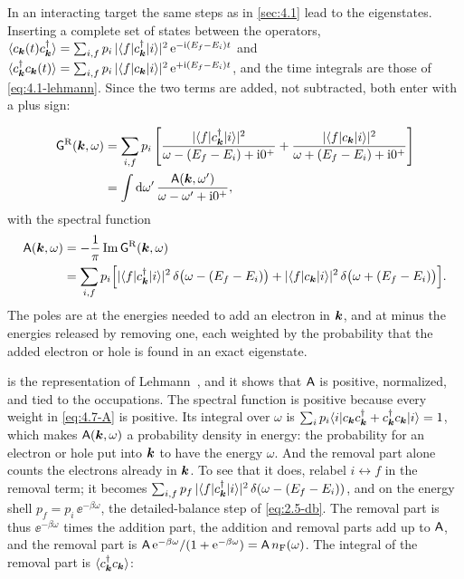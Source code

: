 In an interacting target the same steps as in \cref{sec:4.1} lead to the eigenstates. Inserting a complete set of states between the operators, $\langle c_{\bm{k}}(t)c^\dagger_{\bm{k}}\rangle = \sum_{i,f}p_i\,|\langle f|c^\dagger_{\bm{k}}|i\rangle|^2\,\mathrm{e}^{-\mathrm{i}(E_f - E_i)t}$ and $\langle c^\dagger_{\bm{k}}c_{\bm{k}}(t)\rangle = \sum_{i,f}p_i\,|\langle f|c_{\bm{k}}|i\rangle|^2\,\mathrm{e}^{+\mathrm{i}(E_f - E_i)t}$, and the time integrals are those of \cref{eq:4.1-lehmann}. Since the two terms are added, not subtracted, both enter with a plus sign:
\begin{keyresult}
\begin{equation}
  \begin{aligned}
  \mathsf{G}^{\mathrm{R}}(\bm{k},\omega) &= \sum_{i,f}p_i\left[\frac{|\langle f|c^\dagger_{\bm{k}}|i\rangle|^2}{\omega - (E_f - E_i) + \mathrm{i}0^+} + \frac{|\langle f|c_{\bm{k}}|i\rangle|^2}{\omega + (E_f - E_i) + \mathrm{i}0^+}\right] \\
  &= \int\mathrm{d}\omega'\,\frac{\mathsf{A}(\bm{k},\omega')}{\omega - \omega' + \mathrm{i}0^+} ,
  \end{aligned}
  \label{eq:4.7-lehmann}
\end{equation}
with the spectral function
\begin{equation}
  \begin{aligned}
  \mathsf{A}(\bm{k},\omega) &= -\frac{1}{\pi}\operatorname{Im}\mathsf{G}^{\mathrm{R}}(\bm{k},\omega) \\
  &= \sum_{i,f}p_i\Bigl[|\langle f|c^\dagger_{\bm{k}}|i\rangle|^2\,\delta\bigl(\omega - (E_f - E_i)\bigr) + |\langle f|c_{\bm{k}}|i\rangle|^2\,\delta\bigl(\omega + (E_f - E_i)\bigr)\Bigr] .
  \end{aligned}
  \label{eq:4.7-A}
\end{equation}
The poles are at the energies needed to add an electron in $\bm{k}$, and at minus the energies released by removing one, each weighted by the probability that the added electron or hole is found in an exact eigenstate.
\end{keyresult}
 is the representation of Lehmann~\cite{lehmann1954uber}, and it shows that $\mathsf{A}$ is positive, normalized, and tied to the occupations. The spectral function is positive because every weight in \cref{eq:4.7-A} is positive. Its integral over $\omega$ is $\sum_ip_i\langle i|c_{\bm{k}}c^\dagger_{\bm{k}} + c^\dagger_{\bm{k}}c_{\bm{k}}|i\rangle = 1$, which makes $\mathsf{A}(\bm{k},\omega)$ a probability density in energy: the probability for an electron or hole put into $\bm{k}$ to have the energy $\omega$. And the removal part alone counts the electrons already in $\bm{k}$. To see that it does, relabel $i \leftrightarrow f$ in the removal term; it becomes $\sum_{i,f}p_f\,|\langle f|c^\dagger_{\bm{k}}|i\rangle|^2\,\delta(\omega - (E_f - E_i))$, and on the energy shell $p_f = p_i\,\ee^{-\beta\omega}$, the detailed-balance step of \cref{eq:2.5-db}. The removal part is thus $\ee^{-\beta\omega}$ times the addition part, the addition and removal parts add up to $\mathsf{A}$, and the removal part is $\mathsf{A}\,\mathrm{e}^{-\beta\omega}/(1 + \mathrm{e}^{-\beta\omega}) = \mathsf{A}\,n_{\mathrm{F}}(\omega)$. The integral of the removal part is $\langle c^\dagger_{\bm{k}}c_{\bm{k}}\rangle$:
